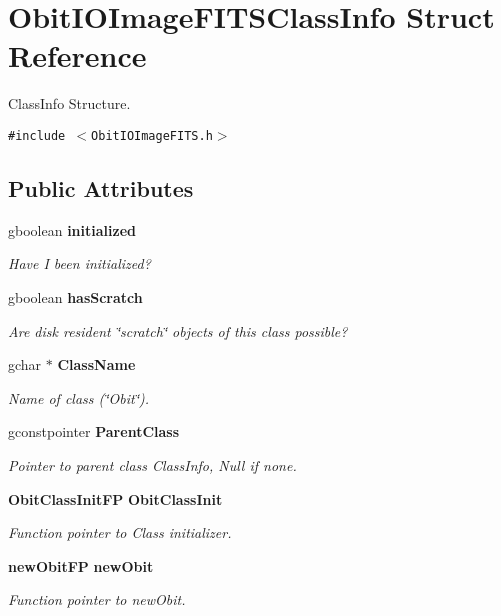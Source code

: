 \section{Obit\-IOImage\-FITSClass\-Info Struct Reference}
\label{structObitIOImageFITSClassInfo}
Class\-Info Structure.  


{\tt \#include $<$Obit\-IOImage\-FITS.h$>$}

\subsection*{Public Attributes}
\begin{CompactItemize}
\item 
gboolean {\bf initialized}
\begin{CompactList}\small\item\em Have I been initialized? \item\end{CompactList}\item 
gboolean {\bf has\-Scratch}
\begin{CompactList}\small\item\em Are disk resident \char`\"{}scratch\char`\"{} objects of this class possible? \item\end{CompactList}\item 
gchar $\ast$ {\bf Class\-Name}
\begin{CompactList}\small\item\em Name of class (\char`\"{}Obit\char`\"{}). \item\end{CompactList}\item 
gconstpointer {\bf Parent\-Class}
\begin{CompactList}\small\item\em Pointer to parent class Class\-Info, Null if none. \item\end{CompactList}\item 
{\bf Obit\-Class\-Init\-FP} {\bf Obit\-Class\-Init}
\begin{CompactList}\small\item\em Function pointer to Class initializer. \item\end{CompactList}\item 
{\bf new\-Obit\-FP} {\bf new\-Obit}
\begin{CompactList}\small\item\em Function pointer to new\-Obit. \item\end{CompactList}\item 

\end{CompactItemize}

